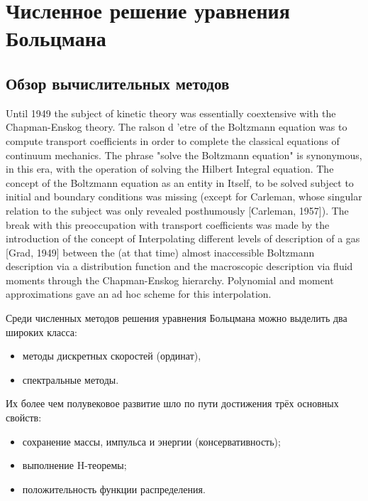 \chapter{Численное решение уравнения Больцмана} \label{chapt:numerics}

\section{Обзор вычислительных методов} \label{sect:review}

Until 1949 the subject of kinetic theory was essentially
coextensive with the Chapman-Enskog theory. The ralson
d 'etre of the Boltzmann equation was to compute transport coefficients in order to complete the classical equations of continuum mechanics. The phrase "solve the Boltzmann equation" is synonymous, in this era, with the operation of solving the Hilbert Integral equation. The concept of the Boltzmann equation as an entity in Itself, to be solved subject to initial and boundary conditions was missing (except for Carleman, whose singular relation to the subject was only revealed posthumously [Carleman, 1957]).
The break with this preoccupation with transport coefficients was made by the introduction of the concept
of Interpolating different levels of description of a
gas [Grad, 1949] between the (at that time) almost inaccessible Boltzmann description via a distribution function and the macroscopic description via fluid moments through the Chapman-Enskog hierarchy. Polynomial and moment approximations gave an ad hoc scheme for this interpolation.




Среди численных методов решения уравнения Больцмана можно выделить два широких класса:
\begin{itemize}
    \item методы дискретных скоростей (ординат),
    \item спектральные методы.
\end{itemize}


Их более чем полувековое развитие шло по пути достижения трёх основных свойств:
\begin{itemize}
    \item сохранение массы, импульса и энергии (консервативность);
    \item выполнение H-теоремы;
    \item положительность функции распределения.
\end{itemize}

